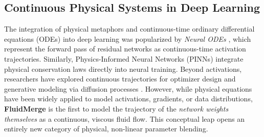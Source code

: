 \subsection{Continuous Physical Systems in Deep Learning}
The integration of physical metaphors and continuous-time ordinary differential equations (ODEs) into deep learning was popularized by \emph{Neural ODEs} \cite{chen2018neural}, which represent the forward pass of residual networks as continuous-time activation trajectories. Similarly, Physics-Informed Neural Networks (PINNs) \cite{raissi2019physics} integrate physical conservation laws directly into neural training. Beyond activations, researchers have explored continuous trajectories for optimizer design \cite{muehlebach2021continuous} and generative modeling via diffusion processes \cite{ho2020denoising, song2020score}. However, while physical equations have been widely applied to model activations, gradients, or data distributions, \textbf{FluidMerge} is the first to model the trajectory of the \emph{network weights themselves} as a continuous, viscous fluid flow. This conceptual leap opens an entirely new category of physical, non-linear parameter blending.
